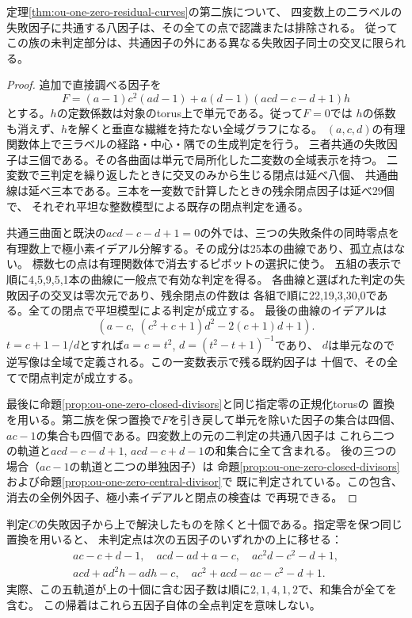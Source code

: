 \begin{proposition}[一零第二族で二つの親判定に共通する全因子]
\label{prop:ou-one-zero-second-all-common}
定理\ref{thm:ou-one-zero-residual-curves}の第二族について、
四変数上の二ラベルの失敗因子に共通する八因子は、その全ての点で認識または排除される。
従ってこの族の未判定部分は、共通因子の外にある異なる失敗因子同士の交叉に限られる。
\end{proposition}
\begin{proof}
追加で直接調べる因子を
\[
 F=(a-1)c^2(ad-1)+a(d-1)(acd-c-d+1)h
\]
とする。$h$の定数係数は対象のtorus上で単元である。従って$F=0$では
$h$の係数も消えず、$h$を解くと垂直な繊維を持たない全域グラフになる。
$(a,c,d)$の有理関数体上で三ラベルの経路・中心・隅での生成判定を行う。
三者共通の失敗因子は三個である。その各曲面は単元で局所化した二変数の全域表示を持つ。
二変数で三判定を繰り返したときに交叉のみから生じる閉点は延べ八個、
共通曲線は延べ三本である。三本を一変数で計算したときの残余閉点因子は延べ29個で、
それぞれ平坦な整数模型による既存の閉点判定を通る。

共通三曲面と既決の$acd-c-d+1=0$の外では、三つの失敗条件の同時零点を
有理数上で極小素イデアル分解する。その成分は25本の曲線であり、孤立点はない。
標数七の点は有理関数体で消去するピボットの選択に使う。
五組の表示で順に4,5,9,5,1本の曲線に一般点で有効な判定を得る。
各曲線と選ばれた判定の失敗因子の交叉は零次元であり、残余閉点の件数は
各組で順に22,19,3,30,0である。全ての閉点で平坦模型による判定が成立する。
最後の曲線のイデアルは
\[
 (a-c,\ (c^2+c+1)d^2-2(c+1)d+1).
\]
$t=c+1-1/d$とすれば$a=c=t^2$, $d=(t^2-t+1)^{-1}$であり、
$d$は単元なので逆写像は全域で定義される。この一変数表示で残る既約因子は
十個で、その全てで閉点判定が成立する。

最後に命題\ref{prop:ou-one-zero-closed-divisors}と同じ指定零の正規化torusの
置換を用いる。第二族を保つ置換で$F$を引き戻して単元を除いた因子の集合は四個、
$ac-1$の集合も四個である。四変数上の元の二判定の共通八因子は
これら二つの軌道と$acd-c-d+1$, $acd-c+d-1$の和集合に全て含まれる。
後の三つの場合（$ac-1$の軌道と二つの単独因子）は
命題\ref{prop:ou-one-zero-closed-divisors}および命題\ref{prop:ou-one-zero-central-divisor}で
既に判定されている。この包含、消去の全例外因子、極小素イデアルと閉点の検査は
で再現できる。
\end{proof}

判定$C$の失敗因子から上で解決したものを除くと十個である。指定零を保つ同じ置換を用いると、
未判定点は次の五因子のいずれかの上に移せる：
\[
 \begin{gathered}
 ac-c+d-1,\quad acd-ad+a-c,\quad ac^2d-c^2-d+1,\\
 acd+ad^2h-adh-c,\quad ac^2+acd-ac-c^2-d+1 .
 \end{gathered}
\]
実際、この五軌道が上の十個に含む因子数は順に$2,1,4,1,2$で、和集合が全てを含む。
この帰着はこれら五因子自体の全点判定を意味しない。

